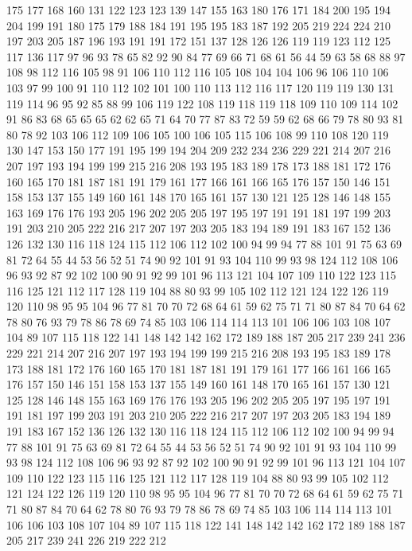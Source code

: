 175 177 168 160 131 122 123 123 139 147 155 163 180 176 171 184 200 195 194 204
199 191 180 175 179 188 184 191 195 195 183 187 192 205 219 224 224 210 197 203
205 187 196 193 191 191 172 151 137 128 126 126 119 119 123 112 125 117 136 117
97 96 93 78 65 82 92 90 84 77 69 66 71 68 61 56 44 59 63 58
68 88 97 108 98 112 116 105 98 91 106 110 112 116 105 108 104 104 106 96
106 110 106 103 97 99 100 91 110 112 102 101 100 110 113 112 116 117 120 119
119 130 131 119 114 96 95 92 85 88 99 106 119 122 108 119 118 119 118 109
110 109 114 102 91 86 83 68 65 65 65 62 62 65 71 64 70 77 87 83
72 59 59 62 68 66 79 78 80 93 81 80 78 92 103 106 112 109 106 105
100 106 105 115 106 108 99 110 108 120 119 130 147 153 150 177 191 195 199 194
204 209 232 234 236 229 221 214 207 216 207 197 193 194 199 199 215 216 208 193
195 183 189 178 173 188 181 172 176 160 165 170 181 187 181 191 179 161 177 166
161 166 165 176 157 150 146 151 158 153 137 155 149 160 161 148 170 165 161 157
130 121 125 128 146 148 155 163 169 176 176 193 205 196 202 205 205 197 195 197
191 191 181 197 199 203 191 203 210 205 222 216 217 207 197 203 205 183 194 189
191 183 167 152 136 126 132 130 116 118 124 115 112 106 112 102 100 94 99 94
77 88 101 91 75 63 69 81 72 64 55 44 53 56 52 51 74 90 92 101
91 93 104 110 99 93 98 124 112 108 106 96 93 92 87 92 102 100 90 91
92 99 101 96 113 121 104 107 109 110 122 123 115 116 125 121 112 117 128 119
104 88 80 93 99 105 102 112 121 124 122 126 119 120 110 98 95 95 104 96
77 81 70 70 72 68 64 61 59 62 75 71 71 80 87 84 70 64 62 78
80 76 93 79 78 86 78 69 74 85 103 106 114 114 113 101 106 106 103 108
107 104 89 107 115 118 122 141 148 142 142 162 172 189 188 187 205 217 239 241
236 229 221 214 207 216 207 197 193 194 199 199 215 216 208 193 195 183 189 178
173 188 181 172 176 160 165 170 181 187 181 191 179 161 177 166 161 166 165 176
157 150 146 151 158 153 137 155 149 160 161 148 170 165 161 157 130 121 125 128
146 148 155 163 169 176 176 193 205 196 202 205 205 197 195 197 191 191 181 197
199 203 191 203 210 205 222 216 217 207 197 203 205 183 194 189 191 183 167 152
136 126 132 130 116 118 124 115 112 106 112 102 100 94 99 94 77 88 101 91
75 63 69 81 72 64 55 44 53 56 52 51 74 90 92 101 91 93 104 110
99 93 98 124 112 108 106 96 93 92 87 92 102 100 90 91 92 99 101 96
113 121 104 107 109 110 122 123 115 116 125 121 112 117 128 119 104 88 80 93
99 105 102 112 121 124 122 126 119 120 110 98 95 95 104 96 77 81 70 70
72 68 64 61 59 62 75 71 71 80 87 84 70 64 62 78 80 76 93 79
78 86 78 69 74 85 103 106 114 114 113 101 106 106 103 108 107 104 89 107
115 118 122 141 148 142 142 162 172 189 188 187 205 217 239 241 226 219 222 212
